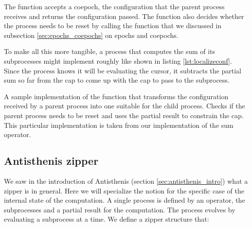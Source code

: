 The  function accepts a coepoch, the configuration
that the parent process receives and returns the configuration
passed. The  function also decides whether the
process needs to be reset by calling the 
function that we discussed in subsection \ref{sec:epochs_coepochs} on
epochs and coepochs.

To make all this more tangible, a process that computes the sum of its
subprocesses might implement  roughly like shown
in listing \ref{lst:localizeconf}. Since the process knows it will be
evaluating the cursor, it subtracts the partial sum so far from the
cap to come up with the cap to pass to the subprocess.


\begin{code}

  \caption{\label{lst:localizeconf}A sample implementation of the
    function that transforms the configuration received by a parent
    process into one suitable for the child process. Checks if the
    parent process needs to be reset and uses the partial result to
    constrain the cap. This particular implementation is taken from
    our implementation of the sum operator.}
\end{code}

\subsection{Antisthenis zipper}
\label{sec:zipper}
We saw in the introduction of Antisthenis
(section \ref{sec:antisthenis_intro}) what a zipper is in general. Here we
will specialize the notion for the specific case of the internal state
of the computation. A single process is defined by an operator, the
subprocesses and a partial result for the computation. The process
evolves by evaluating a subprocess at a time. We define a zipper
structure that:

